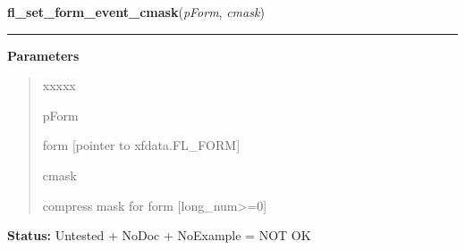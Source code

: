 \hspace{.8\funcindent}\begin{boxedminipage}{\funcwidth}

    \raggedright \textbf{fl\_set\_form\_event\_cmask}(\textit{pForm}, \textit{cmask})

    \vspace{-1.5ex}

    \rule{\textwidth}{0.5\fboxrule}
\setlength{\parskip}{2ex}
\setlength{\parskip}{1ex}
      \textbf{Parameters}
      \vspace{-1ex}

      \begin{quote}
        \begin{Ventry}{xxxxx}

          \item[pForm]

          form [pointer to xfdata.FL\_FORM]

          \item[cmask]

          compress mask for form [long\_num{\textgreater}=0]

        \end{Ventry}

      \end{quote}

\textbf{Status:} Untested + NoDoc + NoExample = NOT OK



    \end{boxedminipage}

    \label{xformslib:library:fl_get_form_event_cmask}

    \vspace{0.5ex}

